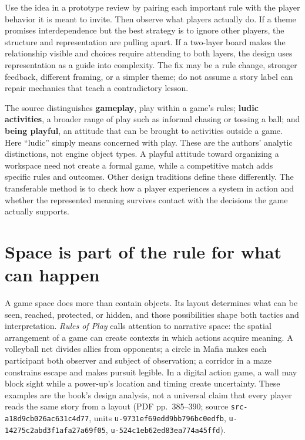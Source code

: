 Use the idea in a prototype review by pairing each important rule with the player behavior it is meant to invite. Then observe what players actually do. If a theme promises interdependence but the best strategy is to ignore other players, the structure and representation are pulling apart. If a two-layer board makes the relationship visible and choices require attending to both layers, the design uses representation as a guide into complexity. The fix may be a rule change, stronger feedback, different framing, or a simpler theme; do not assume a story label can repair mechanics that teach a contradictory lesson.

The source distinguishes \textbf{gameplay}, play within a game's rules; \textbf{ludic activities}, a broader range of play such as informal chasing or tossing a ball; and \textbf{being playful}, an attitude that can be brought to activities outside a game. Here ``ludic'' simply means concerned with play. These are the authors' analytic distinctions, not engine object types. A playful attitude toward organizing a workspace need not create a formal game, while a competitive match adds specific rules and outcomes. Other design traditions define these differently. The transferable method is to check how a player experiences a system in action and whether the represented meaning survives contact with the decisions the game actually supports.

\section{Space is part of the rule for what can happen}\label{06-engine-ii-ch047-space-is-part-of-the-rule-for-what-can-happen}

A game space does more than contain objects. Its layout determines what can be seen, reached, protected, or hidden, and those possibilities shape both tactics and interpretation. \emph{Rules of Play} calls attention to narrative space: the spatial arrangement of a game can create contexts in which actions acquire meaning. A volleyball net divides allies from opponents; a circle in Mafia makes each participant both observer and subject of observation; a corridor in a maze constrains escape and makes pursuit legible. In a digital action game, a wall may block sight while a power-up's location and timing create uncertainty. These examples are the book's design analysis, not a universal claim that every player reads the same story from a layout (PDF pp.~385--390; source \texttt{src-a18d9cb026ac631c4d77}, units \texttt{u-9731ef69edd9bb796bc0edfb}, \texttt{u-14275c2abd3f1afa27a69f05}, \texttt{u-524c1eb62ed83ea774a45ffd}).

